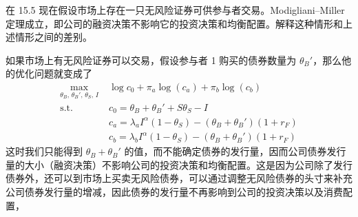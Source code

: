 \begin{problem}
 在 15.5 现在假设市场上存在一只无风险证券可供参与者交易。Modigliani--Miller 定理成立，即公司的融资决策不影响它的投资决策和均衡配置。解释这种情形和上述情形之间的差别。
\end{problem}
\begin{solution}
如果市场上有无风险证券可以交易，假设参与者 1 购买的债券数量为 $\theta_{B}'$，那么他的优化问题就变成了
\[
    \begin{aligned}
        \max_{\theta_{B},\,\theta_{B}',\,\theta_{S},\,I}\;&\log c_{0}+\pi_{a}\log(c_{a})+\pi_{b}\log(c_{b})\\
        \text{s.t.}\;&c_{0}=\theta_{B}+\theta_{B}'+S\theta_{S}-I\\
        &c_{a}=\lambda_{a}I^{\alpha}(1-\theta_{S})-(\theta_{B}+\theta_{B}')(1+r_{F})\\
        &c_{b}=\lambda_{b}I^{\alpha}(1-\theta_{S})-(\theta_{B}+\theta_{B}')(1+r_{F})
    \end{aligned}
\]
这时我们只能得到 $\theta_{B}+\theta_{B}'$ 的值，而不能确定债券的发行量，因而公司债券发行量的大小（融资决策）不影响公司的投资决策和均衡配置。这是因为公司除了发行债券外，还可以到市场上买卖无风险债券，可以通过调整无风险债券的头寸来补充公司债券发行量的增减，因此债券的发行量不再影响到公司的投资决策以及消费配置，
\end{solution}

